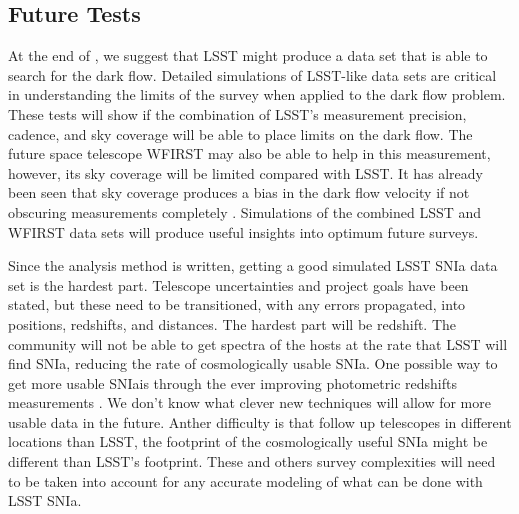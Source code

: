 \documentclass[apj, iop]{emulateapj}
\newcommand{\sn}{SNIa}
\newcommand{\todo}[1]{\textbf{\textcolor{red}{#1}}}
\newcommand{\lcdm}{$\Lambda$CDM}     %
\begin{document}
\subsection{Future Tests}\label{future-tests}

At the end of \cite{Mathews16}, we suggest that LSST might produce a data set
that is able to search for the dark flow. Detailed simulations of LSST-like data
sets are critical in understanding the limits of the survey when applied to the
dark flow problem.  These tests will show if the combination of LSST's
measurement precision, cadence, and sky coverage will be able to place limits on
the dark flow.
The future space telescope WFIRST may also be able to help in this measurement,
however, its sky coverage will be limited compared with LSST. It has already
been seen that sky coverage produces a bias in the dark flow velocity
\citep{Appleby14} if not obscuring measurements completely \citep{Mathews16}.
Simulations of the combined LSST and WFIRST data sets will produce useful
insights into optimum future surveys.

Since the analysis method is written, getting a good simulated LSST \sn{} data
set is the hardest part. Telescope uncertainties and project goals have been
stated, but these need to be transitioned, with any errors propagated, into
positions, redshifts, and distances. The hardest part will be redshift. The
community will not be able to get spectra of the hosts at the rate that LSST
will find \sn, reducing the rate of cosmologically usable \sn. One possible way
to get more usable \sn is through the ever improving photometric redshifts
measurements \citep{Kind13}. We don't know what clever new techniques will allow
for more usable data in the future. Anther difficulty is that follow up
telescopes in different locations than LSST, the footprint of the cosmologically
useful \sn{} might be different than LSST's footprint. These and others survey
complexities will need to be taken into account for any accurate modeling of
what can be done with LSST \sn{}.
\end{document}
